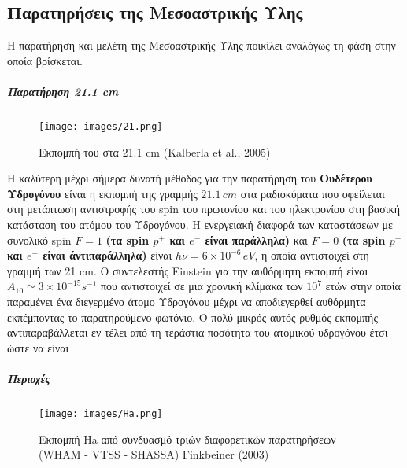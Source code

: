 \documentclass[a4paper,12pt]{memoir}
\begin{document}
\subsection{Παρατηρήσεις της Μεσοαστρικής Ύλης}
Η παρατήρηση και μελέτη της Μεσοαστρικής Ύλης ποικίλει αναλόγως τη φάση στην οποία βρίσκεται.
\subparagraph{Παρατήρηση 21.1 cm}
\begin{figure}[h]
	\centering
	\texttt{[image: images/21.png]}
	\caption{Εκπομπή του  στα 21.1 cm (Kalberla et al., 2005)}
\end{figure}

H καλύτερη μέχρι σήμερα δυνατή μέθοδος για την παρατήρηση του \textbf{Ουδέτερου Υδρογόνου } είναι η εκπομπή της γραμμής $21.1 \, cm$ στα ραδιοκύματα που οφείλεται στη μετάπτωση αντιστροφής του spin του πρωτονίου και του ηλεκτρονίου στη βασική κατάσταση του ατόμου του Υδρογόνου. Η ενεργειακή διαφορά των καταστάσεων με συνολικό spin $F=1$ \textbf{(τα spin $p^+$ και $e^-$ είναι παράλληλα)} και $F=0$ \textbf{(τα spin $p^+$ και $e^-$ είναι άντιπαράλληλα)} είναι $h \nu=6\times 10^{-6} \, eV$, η οποία αντιστοιχεί στη γραμμή των 21 cm.
Ο συντελεστής Einstein για την αυθόρμητη εκπομπή είναι $A_{10} \simeq 3\times 10^{-15}s^{-1}$ που αντιστοιχεί σε μια χρονική κλίμακα των $10^7$ ετών στην οποία παραμένει ένα διεγερμένο άτομο Υδρογόνου μέχρι να αποδιεγερθεί αυθόρμητα εκπέμποντας το παρατηρούμενο φωτόνιο. Ο πολύ μικρός αυτός ρυθμός εκπομπής αντιπαραβάλλεται  εν τέλει από τη τεράστια ποσότητα του ατομικού υδρογόνου έτσι ώστε να είναι     

\subparagraph{Περιοχές }
\begin{figure}[h]
	\centering
	\texttt{[image: images/Ha.png]}
	\caption{Εκπομπή Ha από συνδυασμό τριών διαφορετικών παρατηρήσεων (WHAM - VTSS - SHASSA) Finkbeiner (2003)}
\end{figure}
\end{document}
